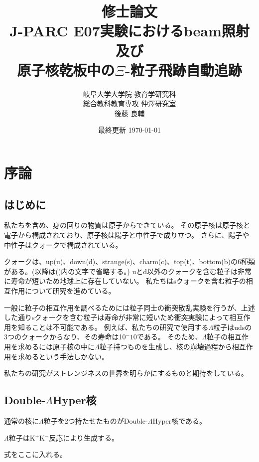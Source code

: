 \documentclass[12pt,a4paper]{jarticle}
\begin{document}
\begin{titlepage}
\title{\vspace{60mm} \LARGE 修士論文\vspace{10mm}\\J-PARC E07実験におけるbeam照射及び\\原子核乾板中の$\Xi$-粒子飛跡自動追跡}
\author{\Large 岐阜大学大学院 教育学研究科 \\ \vspace{5mm}
\Large 総合教科教育専攻 仲澤研究室 \\ \vspace{5mm}
\LARGE 後藤 良輔}
\date{最終更新 \today}
\maketitle
\thispagestyle{empty} %
\end{titlepage}

\thispagestyle{empty} %
\tableofcontents
\newpage
\section{序論}
\subsection{はじめに}
私たちを含め、身の回りの物質は原子からできている。
その原子核は原子核と電子から構成されており、原子核は陽子と中性子で成り立つ。
さらに、陽子や中性子はクォークで構成されている。
\par
クォークは、up(u)、down(d)、strange(s)、charm(c)、top(t)、bottom(b)の6種類がある。(以降は()内の文字で省略する。)
uとd以外のクォークを含む粒子は非常に寿命が短いため地球上に存在していない。
私たちはsクォークを含む粒子の相互作用について研究を進めている。
\par
一般に粒子の相互作用を調べるためには粒子同士の衝突散乱実験を行うが、上述した通りsクォークを含む粒子は寿命が非常に短いため衝突実験によって相互作用を知ることは不可能である。
例えば、私たちの研究で使用する$\Lambda$粒子はudsの3つのクォークからなり、その寿命は10$^-10$である。
そのため、$\Lambda$粒子の相互作用を求めるには原子核の中に$\Lambda$粒子持つものを生成し、核の崩壊過程から相互作用を求めるという手法しかない。
\par
私たちの研究がストレンジネスの世界を明らかにするものと期待をしている。
\subsection{Double-$\Lambda$Hyper核}
通常の核に$\Lambda$粒子を2つ持たせたものがDouble-$\Lambda$Hyper核である。
\par
$\Lambda$粒子はK$^+$K$^-$反応により生成する。
\par
式をここに入れる。
\end{document}
